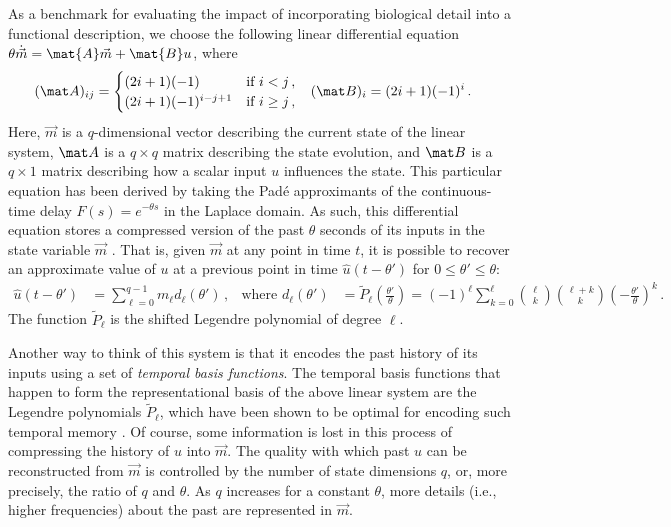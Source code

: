 As a benchmark for evaluating the impact of incorporating biological detail into a functional description, we choose the following linear differential equation $\theta\dot{\vec{m}} = \mat{A} \vec m + \mat{B} u$, where
\begin{align}	
    (\mat A)_{ij} &= \begin{cases}
        (2i + 1)(-1) & \text{if }i < j \,,\\
        (2i + 1)(-1)^{i - j + 1} & \text{if } i \geq j \,,
    \end{cases} &
    (\mat B)_i &= (2i + 1)(-1)^i \,.
    \label{eqn:delay_network_lti}
\end{align}
Here, $\vec m$ is a $q$-dimensional vector describing the current state of the linear system, $\mat A$ is a $q \times q$ matrix describing the state evolution, and $\mat B$ is a $q \times 1$ matrix describing how a scalar input $u$ influences the state.
This particular equation has been derived by taking the Padé approximants of the continuous-time delay $F(s)=e^{-\theta s}$ in the Laplace domain.
As such, this differential equation stores a compressed version of the past $\theta$ seconds of its inputs in the state variable $\vec m$ \citet{voelker2018improving}.
That is, given $\vec m$ at any point in time $t$, it is possible to recover an approximate value of $u$ at a previous point in time $\hat u(t - \theta')$ for $0 \leq \theta' \leq \theta$:
\begin{align}
	\hat u(t - \theta')
		&= \sum_{\ell = 0}^{q - 1} m_\ell d_\ell(\theta') \,, & \text{where } d_\ell(\theta') &= \tilde P_\ell \left(\frac{\theta'}{\theta}\right)
		= 
(-1)^\ell \sum_{k = 0}^\ell \binom{\ell}k \binom{\ell + k}k
			\left(-\frac{\theta'}{\theta}\right)^k\,.
	\label{eqn:delay_network_decoder}
\end{align}
The function $\tilde P_\ell$ is the shifted Legendre polynomial of degree $\ell$.

Another way to think of this system is that it encodes the past history of its inputs using a set of \textit{temporal basis functions}. The temporal basis functions that happen to form the representational basis of the above linear system are the Legendre polynomials $\tilde P_\ell$, which have been shown to be optimal for encoding such temporal memory \cite{voelker2018improving}.
Of course, some information is lost in this process of compressing the history of $u$ into $\vec m$. The quality with which past $u$ can be reconstructed from $\vec m$ is controlled by the number of state dimensions $q$, or, more precisely, the ratio of $q$ and $\theta$.
As $q$ increases for a constant $\theta$, more details (i.e., higher frequencies) about the past are represented in $\vec m$.

